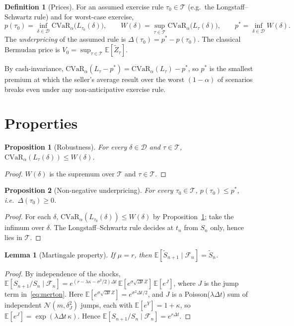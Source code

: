 \documentclass[11pt]{article}
\newtheorem{proposition}{Proposition}
\newtheorem{lemma}{Lemma}
\theoremstyle{definition}
\newtheorem{definition}{Definition}
\theoremstyle{remark}
\newcommand{\E}{\mathbb{E}}
\newcommand{\F}{\mathcal{F}}
\newcommand{\T}{\mathcal{T}}
\newcommand{\D}{\mathcal{D}}
\newcommand{\CVaR}{\mathrm{CVaR}}
\newcommand{\St}{\tilde S}
\newcommand{\Zt}{\tilde Z}
\begin{document}
\begin{definition}[Prices]
For an assumed exercise rule $\tau_0\in\T$ (e.g.\ the Longstaff--Schwartz rule) and for worst-case exercise,
\[
p(\tau_0)=\inf_{\delta\in\D}\CVaR_\alpha\big(L_{\tau_0}(\delta)\big),
\qquad
W(\delta)=\sup_{\tau\in\T}\CVaR_\alpha\big(L_\tau(\delta)\big),
\qquad
p^*=\inf_{\delta\in\D}W(\delta).
\]
The \emph{underpricing} of the assumed rule is $\Delta(\tau_0)=p^*-p(\tau_0)$. The classical Bermudan
price is $V_0=\sup_{\tau\in\T}\E[\Zt_\tau]$.
\end{definition}

By cash-invariance, $\CVaR_\alpha(L_\tau-p^*)=\CVaR_\alpha(L_\tau)-p^*$, so $p^*$ is the smallest premium at
which the seller's average result over the worst $(1-\alpha)$ of scenarios breaks even under any
non-anticipative exercise rule.

\section{Properties}

\begin{proposition}[Robustness]\label{prop:robust}
For every $\delta\in\D$ and $\tau\in\T$, $\CVaR_\alpha(L_\tau(\delta))\le W(\delta)$.
\end{proposition}
\begin{proof}
$W(\delta)$ is the supremum over $\T$ and $\tau\in\T$.
\end{proof}

\begin{proposition}[Non-negative underpricing]\label{prop:underpricing}
For every $\tau_0\in\T$, $p(\tau_0)\le p^*$, i.e.\ $\Delta(\tau_0)\ge 0$.
\end{proposition}
\begin{proof}
For each $\delta$, $\CVaR_\alpha(L_{\tau_0}(\delta))\le W(\delta)$ by Proposition~\ref{prop:robust}; take the
infimum over $\delta$. The Longstaff--Schwartz rule decides at $t_n$ from $S_n$ only, hence lies in $\T$.
\end{proof}

\begin{lemma}[Martingale property]\label{lem:mart}
If $\mu=r$, then $\E[\St_{n+1}\mid\F_n]=\St_n$.
\end{lemma}
\begin{proof}
By independence of the shocks, $\E[S_{n+1}/S_n\mid\F_n]=e^{(r-\lambda\kappa-\sigma^2/2)\Delta t}\,
\E[e^{\sigma\sqrt{\Delta t}Z}]\,\E[e^{J}]$, where $J$ is the jump term in~\eqref{eq:merton}. Here
$\E[e^{\sigma\sqrt{\Delta t}Z}]=e^{\sigma^2\Delta t/2}$, and $J$ is a Poisson($\lambda\Delta t$) sum of
independent $\mathcal N(m,\delta_J^2)$ jumps, each with $\E[e^{Y}]=1+\kappa$, so
$\E[e^{J}]=\exp(\lambda\Delta t\,\kappa)$. Hence $\E[S_{n+1}/S_n\mid\F_n]=e^{r\Delta t}$.
\end{proof}
\end{document}

